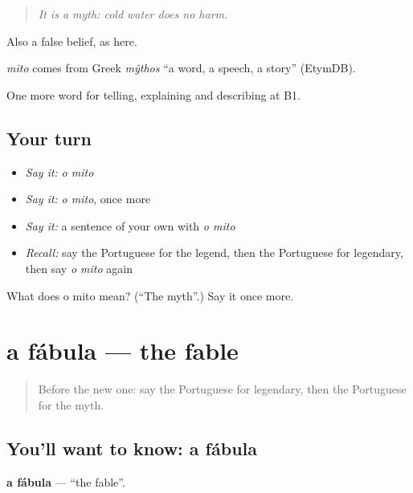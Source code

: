 \begin{quote}
\emph{It is a myth: cold water does no harm.}
\end{quote}

Also a false belief, as here.

\begin{cousinweb}
\emph{mito} comes from Greek \emph{mŷthos} \textquotedblleft{}a word, a speech, a story\textquotedblright{} (EtymDB).
\end{cousinweb}

\begin{grammarlens}[title={What you've built}]
One more word for telling, explaining and describing at B1.
\end{grammarlens}

\subsection*{Your turn}
\begin{itemize}
\raggedright
  \item \emph{Say it:} \emph{o mito}
  \item \emph{Say it:} \emph{o mito}, once more
  \item \emph{Say it:} a sentence of your own with \emph{o mito}
  \item \emph{Recall:} say the Portuguese for the legend, then the Portuguese for legendary, then say \emph{o mito} again
\end{itemize}

\begin{tcolorbox}[breakable,colback=teal!4,colframe=teal!35!black,title={Before you move on}]
What does o mito mean? (\textquotedblleft{}The myth\textquotedblright{}.) Say it once more.
\end{tcolorbox}
\section[a fábula]{a fábula — the fable}

\label{lesson:PT-C326-fabula}



\begin{quote}
Before the new one: say the Portuguese for legendary, then the Portuguese for the myth.
\end{quote}

\subsection*{You'll want to know: a fábula}
\textbf{a fábula} — \textquotedblleft{}the fable\textquotedblright{}.

